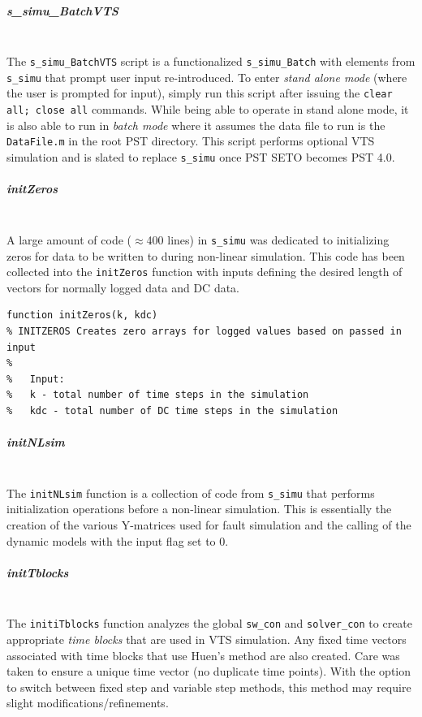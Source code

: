 \documentclass[12pt]{article}
\begin{document}
\subparagraph{s\_simu\_BatchVTS} \ \\
The \verb|s_simu_BatchVTS| script is a functionalized \verb|s_simu_Batch| with elements from \verb|s_simu| that prompt user input re-introduced.
To enter \emph{stand alone mode} (where the user is prompted for input), simply run this script after issuing the \verb|clear all; close all| commands.
While being able to operate in stand alone mode, it is also able to run in \emph{batch mode} where it assumes the data file to run is the \verb|DataFile.m| in the root PST directory.
This script performs optional VTS simulation and is slated to replace \verb|s_simu| once PST SETO becomes PST 4.0.


\subparagraph{initZeros} \ \\
A large amount of code ($\approx$400 lines) in \verb|s_simu| was dedicated to initializing zeros for data to be written to during non-linear simulation.
This code has been collected into the \verb|initZeros| function with inputs defining the desired length of vectors for normally logged data and DC data.

\begin{verbatim}
function initZeros(k, kdc)
% INITZEROS Creates zero arrays for logged values based on passed in input
%
%   Input:
%   k - total number of time steps in the simulation
%   kdc - total number of DC time steps in the simulation
\end{verbatim}

\subparagraph{initNLsim} \ \\
The \verb|initNLsim| function is a collection of code from \verb|s_simu| that performs initialization operations before a non-linear simulation.
This is essentially the creation of the various Y-matrices used for fault simulation and the calling of the dynamic models with the input flag set to 0.

\pagebreak
\subparagraph{initTblocks} \ \\
The \verb|initiTblocks| function analyzes the global \verb|sw_con| and \verb|solver_con| to create appropriate \emph{time blocks} that are used in VTS simulation.
Any fixed time vectors associated with time blocks that use Huen's method are also created.
Care was taken to ensure a unique time vector (no duplicate time points).
With the option to switch between fixed step and variable step  methods, this method may require slight modifications/refinements.
\end{document}
